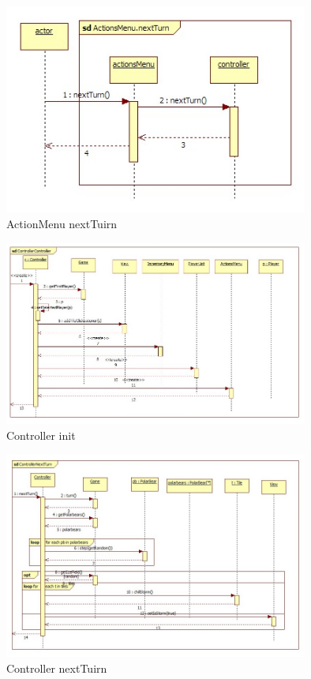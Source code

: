 \begin{figure}[H]
	\begin{center}
		\includegraphics[width=10cm]{chapters/chapter11/seq/ActionsMenu.nextTurn.jpg}
		\caption{ActionMenu nextTuirn}
		\label{ActionMenu nextTurn}
	\end{center}
\end{figure}
\begin{figure}[H]
	\begin{center}
		\includegraphics[width=10cm]{chapters/chapter11/seq/Controller_Controller.jpg}
		\caption{Controller init}
		\label{Controller init}
	\end{center}
\end{figure}
\begin{figure}[H]
	\begin{center}
		\includegraphics[width=10cm]{chapters/chapter11/seq/Controller_NextTurn.jpg}
		\caption{Controller nextTuirn}
		\label{Controller nextTurn}
	\end{center}
\end{figure}
